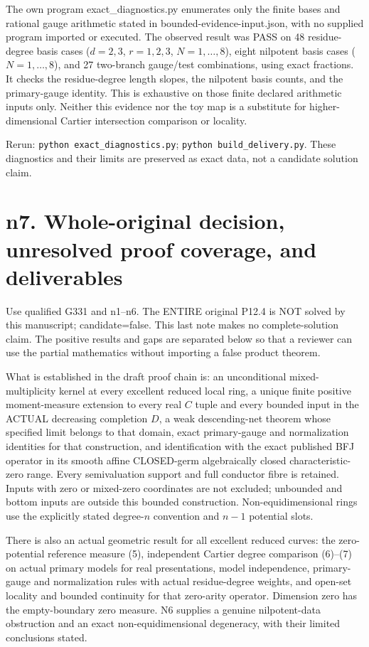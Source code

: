 \documentclass[
  11pt,
]{article}
\begin{document}
The own program exact\_diagnostics.py enumerates only the finite bases
and rational gauge arithmetic stated in bounded-evidence-input.json,
with no supplied program imported or executed. The observed result was
PASS on 48 residue-degree basis cases (\(d=2,3\), \(r=1,2,3\),
\(N=1,\ldots,8\)), eight nilpotent basis cases (\(N=1,\ldots,8\)), and
27 two-branch gauge/test combinations, using exact fractions. It checks
the residue-degree length slopes, the nilpotent basis counts, and the
primary-gauge identity. This is exhaustive on those finite declared
arithmetic inputs only. Neither this evidence nor the toy map is a
substitute for higher-dimensional Cartier intersection comparison or
locality.

Rerun: \texttt{python\ exact\_diagnostics.py};
\texttt{python\ build\_delivery.py}. These diagnostics and their limits
are preserved as exact data, not a candidate solution claim.

\section{n7. Whole-original decision, unresolved proof coverage, and
deliverables}\label{n7.-whole-original-decision-unresolved-proof-coverage-and-deliverables}

Use qualified G331 and n1--n6. The ENTIRE original P12.4 is NOT solved
by this manuscript; candidate=false. This last note makes no
complete-solution claim. The positive results and gaps are separated
below so that a reviewer can use the partial mathematics without
importing a false product theorem.

What is established in the draft proof chain is: an unconditional
mixed-multiplicity kernel at every excellent reduced local ring, a
unique finite positive moment-measure extension to every real \(C\)
tuple and every bounded input in the ACTUAL decreasing completion \(D\),
a weak descending-net theorem whose specified limit belongs to that
domain, exact primary-gauge and normalization identities for that
construction, and identification with the exact published BFJ operator
in its smooth affine CLOSED-germ algebraically closed
characteristic-zero range. Every semivaluation support and full
conductor fibre is retained. Inputs with zero or mixed-zero coordinates
are not excluded; unbounded and bottom inputs are outside this bounded
construction. Non-equidimensional rings use the explicitly stated
degree-\(n\) convention and \(n-1\) potential slots.

There is also an actual geometric result for all excellent reduced
curves: the zero-potential reference measure (5), independent Cartier
degree comparison (6)--(7) on actual primary models for real
presentations, model independence, primary-gauge and normalization rules
with actual residue-degree weights, and open-set locality and bounded
continuity for that zero-arity operator. Dimension zero has the
empty-boundary zero measure. N6 supplies a genuine nilpotent-data
obstruction and an exact non-equidimensional degeneracy, with their
limited conclusions stated.
\end{document}
